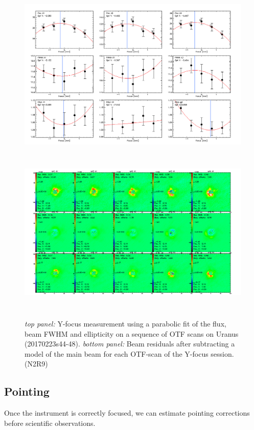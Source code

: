 \begin{figure}[h!]
\centering
\includegraphics[height=8cm]{Figures/plot_20170223s44.png}
\hspace{0.5cm}
\includegraphics[height=8cm]{Figures/residuals_focus_otf_20170223s44.png}
\caption[Lateral Y focus measures]{\emph{top panel: }Y-focus measurement using a
    parabolic fit of the flux, beam FWHM and ellipticity on a sequence
    of OTF scans on Uranus (20170223s44-48). \emph{bottom panel: }Beam residuals
    after subtracting a model of the main beam for each OTF-scan of the Y-focus
    session. (N2R9)}
\label{fig:Y_focus}
\end{figure}


\subsection{Pointing}
\label{se:pointing}

Once the instrument is correctly focused, we can estimate pointing corrections
before scientific observations.

